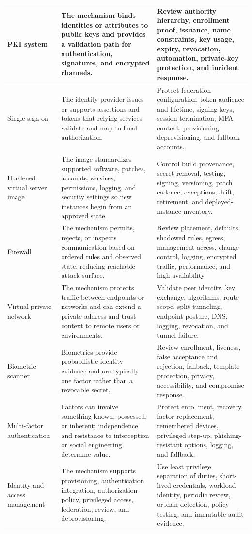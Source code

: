 \documentclass[11pt]{article}
\begin{document}
\begin{longtable}{@{}>{\RaggedRight\arraybackslash}p{}>{\RaggedRight\arraybackslash}p{}>{\RaggedRight\arraybackslash}p{}@{}}
PKI system & The mechanism binds identities or attributes to public keys and provides a validation path for authentication, signatures, and encrypted channels. & Review authority hierarchy, enrollment proof, issuance, name constraints, key usage, expiry, revocation, automation, private-key protection, and incident response. \\\midrule
Single sign-on & The identity provider issues or supports assertions and tokens that relying services validate and map to local authorization. & Protect federation configuration, token audience and lifetime, signing keys, session termination, MFA context, provisioning, deprovisioning, and fallback accounts. \\\midrule
Hardened virtual server image & The image standardizes supported software, patches, accounts, services, permissions, logging, and security settings so new instances begin from an approved state. & Control build provenance, secret removal, testing, signing, versioning, patch cadence, exceptions, drift, retirement, and deployed-instance inventory. \\\midrule
Firewall & The mechanism permits, rejects, or inspects communication based on ordered rules and observed state, reducing reachable attack surface. & Review placement, defaults, shadowed rules, egress, management access, change control, logging, encrypted traffic, performance, and high availability. \\\midrule
Virtual private network & The mechanism protects traffic between endpoints or networks and can extend a private address and trust context to remote users or environments. & Validate peer identity, key exchange, algorithms, route scope, split tunneling, endpoint posture, DNS, logging, revocation, and tunnel failure. \\\midrule
Biometric scanner & Biometrics provide probabilistic identity evidence and are typically one factor rather than a revocable secret. & Review enrollment, liveness, false acceptance and rejection, fallback, template protection, privacy, accessibility, and compromise response. \\\midrule
Multi-factor authentication & Factors can involve something known, possessed, or inherent; independence and resistance to interception or social engineering determine value. & Protect enrollment, recovery, factor replacement, remembered devices, privileged step-up, phishing-resistant options, logging, and fallback. \\\midrule
Identity and access management & The mechanism supports provisioning, authentication integration, authorization policy, privileged access, federation, review, and deprovisioning. & Use least privilege, separation of duties, short-lived credentials, workload identity, periodic review, orphan detection, policy testing, and immutable audit evidence. \\\midrule

\end{longtable}
\end{document}
